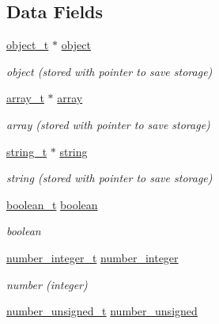 \subsection*{Data Fields}
\begin{DoxyCompactItemize}
\item 
\hyperlink{classnlohmann_1_1basic__json_a5e48a7893520e1314bf0c9723e26ea2a}{object\+\_\+t} $\ast$ \hyperlink{unionnlohmann_1_1basic__json_1_1json__value_a4a2209bb26e7088cd36bf24824ab5521}{object}
\begin{DoxyCompactList}\small\item\em object (stored with pointer to save storage) \end{DoxyCompactList}\item 
\hyperlink{classnlohmann_1_1basic__json_ae095578e03df97c5b3991787f1056374}{array\+\_\+t} $\ast$ \hyperlink{unionnlohmann_1_1basic__json_1_1json__value_a7947687f3ae1911d6e9847e2b3226157}{array}
\begin{DoxyCompactList}\small\item\em array (stored with pointer to save storage) \end{DoxyCompactList}\item 
\hyperlink{classnlohmann_1_1basic__json_a61f8566a1a85a424c7266fb531dca005}{string\+\_\+t} $\ast$ \hyperlink{unionnlohmann_1_1basic__json_1_1json__value_a9856fb4271b50d738e14c5a9a2f05118}{string}
\begin{DoxyCompactList}\small\item\em string (stored with pointer to save storage) \end{DoxyCompactList}\item 
\hyperlink{classnlohmann_1_1basic__json_a4c919102a9b4fe0d588af64801436082}{boolean\+\_\+t} \hyperlink{unionnlohmann_1_1basic__json_1_1json__value_afd0f8ec00c40301efffd01a276959371}{boolean}
\begin{DoxyCompactList}\small\item\em boolean \end{DoxyCompactList}\item 
\hyperlink{classnlohmann_1_1basic__json_a98e611d67b7bd75307de99c9358ab2dc}{number\+\_\+integer\+\_\+t} \hyperlink{unionnlohmann_1_1basic__json_1_1json__value_afa3c414445aeffb56a7c6926f9420941}{number\+\_\+integer}
\begin{DoxyCompactList}\small\item\em number (integer) \end{DoxyCompactList}\item 
\hyperlink{classnlohmann_1_1basic__json_ab906e29b5d83ac162e823ada2156b989}{number\+\_\+unsigned\+\_\+t} \hyperlink{unionnlohmann_1_1basic__json_1_1json__value_a0299a6aa3bc4d45d54130e52970f73d3}{number\+\_\+unsigned}

\end{DoxyCompactItemize}
